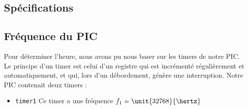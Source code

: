 \documentclass[12pt,a4paper]{article}
\begin{document}
    \subsection{Spécifications}
    
    \subsection{Fréquence du PIC}
    
    Pour déterminer l'heure, nous avons pu nous baser sur les timers de notre PIC. Le principe d'un timer est celui d'un registre qui est incrémenté régulièrement et automatiquement, et qui, lors d'un débordement, génère une interruption. Notre PIC contenait deux timers :
    \begin{itemize}
    \item \texttt{timer1}  Ce timer a une fréquence $f_1 = \unit{32768}{\hertz}$
    \end{itemize}
    
% 
% 
% 
% 
% 
% 
% 
 
\end{document}
